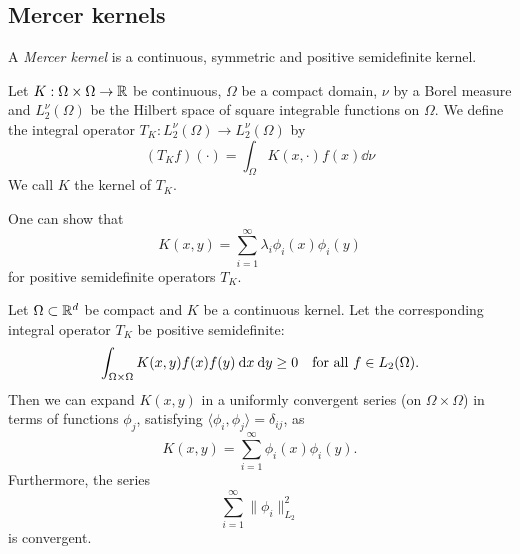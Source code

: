 \documentclass[../skript.tex]{subfiles}
\begin{document}
\subsection*{Mercer kernels}
\begin{definition} %
\label{thm:35}
A \emph{Mercer kernel} is a continuous, symmetric and positive semidefinite kernel.
\end{definition}
\begin{definition} %
\label{thm:36}
Let $K : \Omega \times \Omega \to \mathbb{R}$ be continuous, $\Omega$ be a compact domain, $\nu$ by a Borel measure and $L_2^\nu(\Omega)$ be the Hilbert space of square integrable functions on $\Omega$.
We define the integral operator $T_K : L_2^\nu(\Omega) \to L_2^\nu(\Omega)$ by
\[
	\left( T_K f \right) (\cdot) = \int_\Omega K(x, \cdot) f(x) \dd \nu
\]
We call $K$ the kernel of $T_K$.
\end{definition}
One can show that
\[
	K(x, y) = \sum_{i=1}^\infty \lambda_i \phi_i(x) \phi_i(y)
\]
for positive semidefinite operators $T_K$.
\begin{theorem} %
\label{thm:37}
Let $\Omega \subset \mathbb{R}^d$ be compact and $K$ be a continuous kernel.
Let the corresponding integral operator $T_K$ be positive semidefinite:
\[
	\int_{\Omega \times \Omega} K(x, y) f(x) f(y) \:\mathrm{d} x \:\mathrm{d} y \geq 0 \quad \text{for all } f \in L_2(\Omega).
\]
Then we can expand $K(x, y)$ in a uniformly convergent series (on $\Omega \times \Omega$) in terms of functions $\phi_j$, satisfying $\langle \phi_i, \phi_j \rangle = \delta_{ij}$, as
\[
	K(x, y) = \sum_{i=1}^\infty \phi_i(x) \phi_i(y).
\]
Furthermore, the series
\[
	\sum_{i=1}^\infty \| \phi_i \|_{L_2}^2
\]
is convergent.
\end{theorem}
\end{document}

